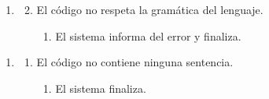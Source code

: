 \begin{framed}
\begin{description}
\begin{enumerate}
\begin {enumerate}
\begin{enumerate}
         \end{enumerate}
      \end{enumerate}
   \end{enumerate}
   \begin{enumerate} \itemsep1pt \parskip0pt 
   \setcounter{enumi}{0}
   \renewcommand{\labelenumi}{}
   \renewcommand{\labelenumiii}{\arabic{enumiii}.}
   \renewcommand{\labelenumii}{\arabic{enumi}\alph{enumii}.}
      \item 
      \begin {enumerate}
         \setcounter{enumii}{1}
         \item El código no respeta la gramática del lenguaje.
         \begin{enumerate}
         \item El sistema informa del error y finaliza.
         \end{enumerate}
      \end{enumerate}
   \end{enumerate}
   \begin{enumerate} \itemsep1pt \parskip0pt 
   \setcounter{enumi}{1}
   \renewcommand{\labelenumi}{}
   \renewcommand{\labelenumiii}{\arabic{enumiii}.}
   \renewcommand{\labelenumii}{\arabic{enumi}\alph{enumii}.}
      \item 
      \begin {enumerate}
         \setcounter{enumii}{0}
         \item El código no contiene ninguna sentencia.
         \begin{enumerate}
         \item El sistema finaliza.
         \end{enumerate}
      \end{enumerate}
   \end{enumerate}
\end{description}
 \FloatBarrier
\end{framed}
